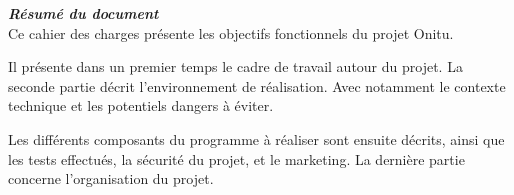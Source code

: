 \thispagestyle{empty}
\vspace*{10mm}

\textbf{\emph{\textcolor{epiBlue}{Résumé du document} } }\\

Ce cahier des charges présente les objectifs fonctionnels du projet Onitu.

Il présente dans un premier temps le cadre de travail autour du projet.
La seconde partie décrit l'environnement de réalisation. Avec notamment le contexte technique et les potentiels dangers à éviter.

Les différents composants du programme à réaliser sont ensuite décrits, ainsi que les tests effectués, la sécurité du projet, et le marketing.
La dernière partie concerne l'organisation du projet.

\newpage
